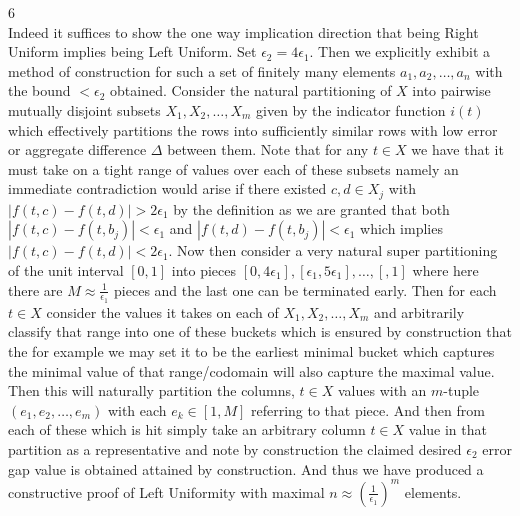 6 \\
Indeed it suffices to show the one way implication direction that being Right Uniform implies being Left Uniform. Set $\epsilon_2 = 4 \epsilon_1$. Then we explicitly exhibit a method of construction for such a set of finitely many elements $a_1,a_2,\dots,a_n$ with the bound $< \epsilon_2$ obtained. Consider the natural partitioning of $X$ into pairwise mutually disjoint subsets $X_1,X_2,\dots,X_m$ given by the indicator function $i(t)$ which effectively partitions the rows into sufficiently similar rows with low error or aggregate difference $\Delta$ between them. Note that for any $t \in X$ we have that it must take on a tight range of values over each of these subsets namely an immediate contradiction would arise if there existed $c,d \in X_j$ with $|f(t,c)-f(t,d)| > 2 \epsilon_1$ by the definition as we are granted that both $|f(t,c)-f(t,b_j)| < \epsilon_1$ and $|f(t,d)-f(t,b_j)| < \epsilon_1$ which implies $|f(t,c)-f(t,d)| < 2 \epsilon_1$. Now then consider a very natural super partitioning of the unit interval $[0,1]$ into pieces $[0,4 \epsilon_1], [\epsilon_1,5 \epsilon_1], \dots, [,1]$ where here there are $M \approx \frac{1}{\epsilon_1}$ pieces and the last one can be terminated early. Then for each $t \in X$ consider the values it takes on each of $X_1,X_2,\dots,X_m$ and arbitrarily classify that range into one of these buckets which is ensured by construction that the for example we may set it to be the earliest minimal bucket which captures the minimal value of that range/codomain will also capture the maximal value. Then this will naturally partition the columns, $t \in X$ values with an $m$-tuple $(e_1,e_2,\dots,e_m)$ with each $e_k \in [1,M]$ referring to that piece. And then from each of these which is hit simply take an arbitrary column $t \in X$ value in that partition as a representative and note by construction the claimed desired $\epsilon_2$ error gap value is obtained attained by construction. And thus we have produced a constructive proof of Left Uniformity with maximal $n \approx \left( \frac{1}{\epsilon_1} \right)^m$ elements.



